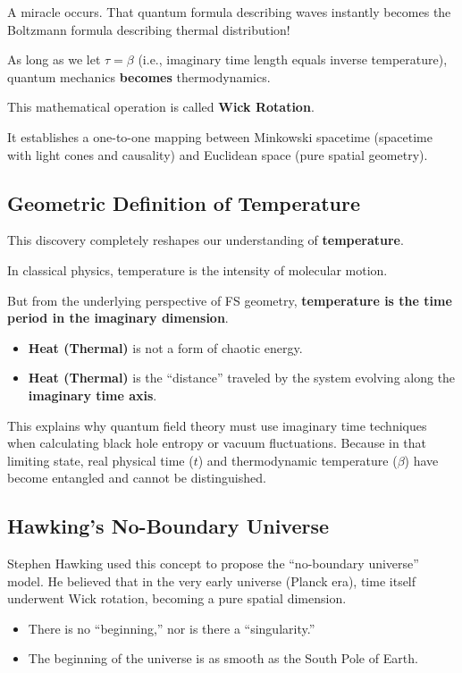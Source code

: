 \documentclass[11pt,a4paper,twoside]{book}
\begin{document}
A miracle occurs. That quantum formula describing waves instantly becomes the Boltzmann formula describing thermal distribution!

As long as we let $\tau = \beta$ (i.e., imaginary time length equals inverse temperature), quantum mechanics \textbf{becomes} thermodynamics.

This mathematical operation is called \textbf{Wick Rotation}.

It establishes a one-to-one mapping between Minkowski spacetime (spacetime with light cones and causality) and Euclidean space (pure spatial geometry).

\subsection{Geometric Definition of Temperature}

This discovery completely reshapes our understanding of \textbf{temperature}.

In classical physics, temperature is the intensity of molecular motion.

But from the underlying perspective of FS geometry, \textbf{temperature is the time period in the imaginary dimension}.

\begin{itemize}
\item \textbf{Heat (Thermal)} is not a form of chaotic energy.

\item \textbf{Heat (Thermal)} is the ``distance'' traveled by the system evolving along the \textbf{imaginary time axis}.
\end{itemize}

This explains why quantum field theory must use imaginary time techniques when calculating black hole entropy or vacuum fluctuations. Because in that limiting state, real physical time ($t$) and thermodynamic temperature ($\beta$) have become entangled and cannot be distinguished.

\subsection{Hawking's No-Boundary Universe}

Stephen Hawking used this concept to propose the ``no-boundary universe'' model. He believed that in the very early universe (Planck era), time itself underwent Wick rotation, becoming a pure spatial dimension.

\begin{itemize}
\item There is no ``beginning,'' nor is there a ``singularity.''

\item The beginning of the universe is as smooth as the South Pole of Earth.
\end{itemize}
\end{document}
